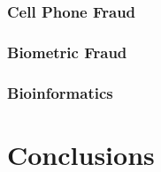 \documentclass[midd]{thesis}
\begin{document}
\subsection{Cell Phone Fraud}
\pagebreak

\subsection{Biometric Fraud}
\pagebreak

\subsection{Bioinformatics}
\pagebreak

\chapter{Conclusions}
\pagebreak



\end{document}
